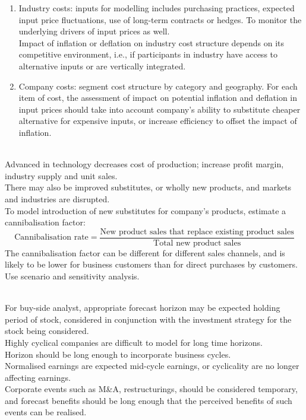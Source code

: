 \begin{remark} 
\begin{enumerate}[label=\roman*.]
\setlength{\itemsep}{0pt}
\item Industry costs: inputs for modelling includes purchasing practices, expected input price fluctuations, use of long-term contracts or hedges. To monitor the underlying drivers of input prices as well.\\
Impact of inflation or deflation on industry cost structure depends on its competitive environment, i.e., if participants in industry have access to alternative inputs or are vertically integrated.
\item Company costs: segment cost structure by category and geography. For each item of cost, the assessment of impact on potential inflation and deflation in input prices should take into account company's ability to substitute cheaper alternative for expensive inputs, or increase efficiency to offset the impact of inflation.
\end{enumerate}
\end{remark}

\begin{remark} \\
Advanced in technology decreases cost of production; increase profit margin, industry supply and unit sales.\\
There may also be improved substitutes, or wholly new products, and markets and industries are disrupted.\\
To model introduction of new substitutes for company's products, estimate a cannibalisation factor:
\begin{equation}
\text{Cannibalisation rate} = \frac{\text{New product sales that replace existing product sales}}{\text{Total new product sales}} \nonumber
\end{equation}
The cannibalisation factor can be different for different sales channels, and is likely to be lower for business customers than for direct purchases by customers.\\
Use scenario and sensitivity analysis.
\end{remark}

\begin{remark} \\
For buy-side analyst, appropriate forecast horizon may be expected holding period of stock, considered in conjunction with the investment strategy for the stock being considered.\\
Highly cyclical companies are difficult to model for long time horizons.\\
Horizon should be long enough to incorporate business cycles.\\
Normalised earnings are expected mid-cycle earnings, or cyclicality are no longer affecting earnings.\\
Corporate events such as M\&A, restructurings, should be considered temporary, and forecast benefits should be long enough that the perceived benefits of such events can be realised.
\end{remark}

